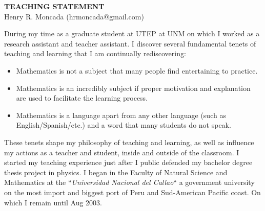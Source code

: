 \documentclass[a4paper, 11pt]{article}
\begin{document}
\thispagestyle{fancy}
\lhead{}
\rhead{}
\renewcommand{\headrulewidth}{0pt} 
\renewcommand{\footrulewidth}{0pt} 
\fancyfoot[C]{\footnotesize \textcolor{gray}{ }} 


\pagestyle{fancy}
\lhead{\textcolor{gray}{\it Henry R. Moncada}}
\rhead{\textcolor{gray}{\thepage/\totalpages{}}}

\begin{small}

\begin{center}
{\LARGE \bf TEACHING STATEMENT}\\
\vspace*{0.1cm}
{\normalsize Henry R. Moncada (hrmoncada@gmail.com)}
\end{center}



During my time as a graduate student at UTEP at UNM on which I worked as a research assistant and teacher assistant.
I discover several fundamental tenets of teaching and learning that I am continually rediscovering:
\begin{itemize}
\item Mathematics is not a subject that many people find entertaining to practice.
\item Mathematics is an incredibly subject if proper motivation and explanation are used to facilitate the learning process.
\item Mathematics is a language apart from any other language (such as English/Spanish/etc.) and a word that many students do not speak.
\end{itemize}
These tenets shape my philosophy of teaching and learning, as well as influence my actions as a teacher and student, inside and outside of the classroom. 
I started my teaching experience just after I public defended my bachelor degree thesis project in physics. 
I began in the Faculty of Natural Science and Mathematics at the ``\textit{Universidad Nacional del Callao}`` a government university on the most import and biggest port of Peru and Sud-American Pacific coast. 
On which I remain until Aug 2003. 


\end{small}
\end{document}
